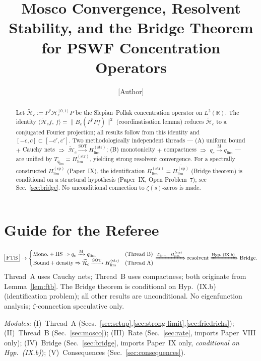 \documentclass[12pt,a4paper]{amsart}
\theoremstyle{definition}
\theoremstyle{remark}
\newcommand{\ip}[2]{\langle #1,\, #2\rangle}
\newcommand{\Hc}{\widetilde{\mathcal{H}}_c}
\newcommand{\Hstrong}{H_{\lim}^{(\mathrm{str})}}
\newcommand{\Hspectral}{H_{\lim}^{(\mathrm{sp})}}
\newcommand{\qc}{q_c}
\newcommand{\qlim}{q_{\lim}}
\newcommand{\Bc}{B_c}
\begin{document}
\title[Mosco Convergence and Resolvent Stability
  of PSWF Concentration Forms]{%
  Mosco Convergence, Resolvent Stability,
  and the Bridge Theorem for
  PSWF Concentration Operators}

\author{[Author]}
\address{[Address]}
\email{[Email]}

\maketitle

\begin{abstract}
Let $\Hc:=P^*\mathcal{H}_c^{[0,1]}P$
be the Slepian--Pollak concentration
operator on $L^2(\mathbb{R})$.
The identity
$\ip{\Hc f}{f}=\|\Bc(P^*Pf)\|^2$
(coordinatisation lemma)
reduces $\Hc$ to a conjugated Fourier
projection; all results follow from
this identity and
$[-c,c]\subset[-c',c']$.
Two methodologically independent
threads --- (A) uniform bound $+$
Cauchy nets $\Rightarrow$
$\Hc\xrightarrow{\mathrm{SOT}}\Hstrong$;
(B) monotonicity $+$ compactness
$\Rightarrow$
$\qc\xrightarrow{\mathrm{M}}\qlim$ ---
are unified by $T_{\qlim}=\Hstrong$,
yielding strong resolvent convergence.
For a spectrally constructed
$\Hspectral$ (Paper~IX),
the identification
$\Hstrong=\overline{\Hspectral}$
(Bridge theorem) is conditional
on a structural hypothesis
(Paper~IX, Open Problem~7);
see Sec.~\ref{sec:bridge}.
No unconditional connection to
$\zeta(s)$-zeros is made.
\end{abstract}

\section*{Guide for the Referee}

\[
\boxed{\text{FTB}}
\to
\begin{cases}
  \text{Mono.}+\text{HS}
  \Rightarrow
  \qc\xrightarrow{\mathrm{M}}\qlim
  &\text{(Thread B)}\\
  \text{Bound}+\text{density}
  \Rightarrow
  \Hc\xrightarrow{\mathrm{SOT}}\Hstrong
  &\text{(Thread A)}
\end{cases}
\xRightarrow{T_{\qlim}=\Hstrong}
\text{resolvent}
\xRightarrow{\text{Hyp.~(IX.b)}}
\text{Bridge.}
\]
Thread~A uses Cauchy nets;
Thread~B uses compactness;
both originate from
Lemma~\ref{lem:ftb}.
The Bridge theorem is conditional
on Hyp.~(IX.b) (identification problem);
all other results are unconditional.
No eigenfunction analysis;
$\zeta$-connection speculative only.

\textit{Modules:}
(I)~Thread~A
(Secs.~\ref{sec:setup},\ref{sec:strong-limit},\ref{sec:friedrichs});
(II)~Thread~B (Sec.~\ref{sec:mosco});
(III)~Rate (Sec.~\ref{sec:rate},
imports Paper~VIII only);
(IV)~Bridge (Sec.~\ref{sec:bridge},
imports Paper~IX only,
\emph{conditional on Hyp.~(IX.b)});
(V)~Consequences (Sec.~\ref{sec:consequences}).
\end{document}
